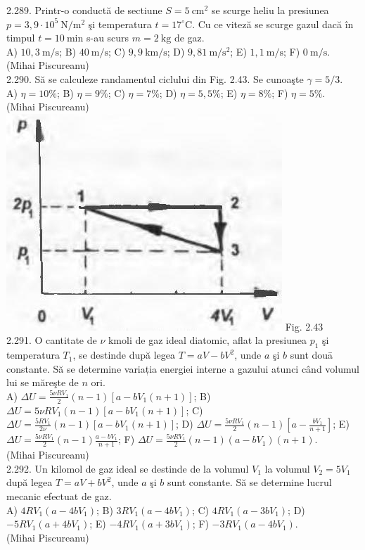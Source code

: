 2.289. Printr-o conductă de sectiune $S=5 \mathrm{~cm}^{2}$ se scurge heliu la presiunea $p=3,9 \cdot 10^{5} \mathrm{~N} / \mathrm{m}^{2}$ şi temperatura $t=17^{\circ} \mathrm{C}$. Cu ce viteză se scurge gazul dacă în timpul $t=10 \mathrm{~min}$ s-au scurs $m=2 \mathrm{~kg}$ de gaz.\\ A) $10,3 \mathrm{~m} / \mathrm{s}$; B) $40 \mathrm{~m} / \mathrm{s}$; C) $9,9 \mathrm{~km} / \mathrm{s}$; D) $9,81 \mathrm{~m} / \mathrm{s}^{2}$; E) $1,1 \mathrm{~m} / \mathrm{s}$; F) $0 \mathrm{~m} / \mathrm{s}$.\\ (Mihai Piscureanu)\\

2.290. Să se calculeze randamentul ciclului din Fig. 2.43. Se cunoaşte $\gamma=5 / 3$.\\ A) $\eta=10 \%$; B) $\eta=9 \%$; C) $\eta=7 \%$; D) $\eta=5,5 \%$; E) $\eta=8 \%$; F) $\eta=5 \%$.\\ (Mihai Piscureanu)\\ \includegraphics[width=0.4\linewidth]{images/2025_07_01_5b3ff9fa0d508c8e9f17g-138} Fig. 2.43\\

2.291. O cantitate de $\nu$ kmoli de gaz ideal diatomic, aflat la presiunea $p_{1}$ şi temperatura $T_{1}$, se destinde după legea $T=a V-b V^{2}$, unde $a$ şi $b$ sunt douā constante. Să se determine variația energiei interne a gazului atunci când volumul lui se măreşte de $n$ ori.\\ A) $\Delta U=\frac{5 \nu R V_{1}}{2}(n-1)\left[a-b V_{1}(n+1)\right]$; B) $\Delta U=5 \nu R V_{1}(n-1)\left[a-b V_{1}(n+1)\right]$; C) $\Delta U=\frac{5 R V_{1}}{2 \nu}(n-1)\left[a-b V_{1}(n+1)\right]$; D) $\Delta U=\frac{5 \nu R V_{1}}{2}(n-1)\left[a-\frac{b V_{1}}{n+1}\right]$; E) $\Delta U=\frac{5 \nu R V_{1}}{2}(n-1) \frac{a-b V_{1}}{n+1}$; F) $\Delta U=\frac{5 \nu R V_{1}}{2}(n-1)\left(a-b V_{1}\right)(n+1)$.\\ (Mihai Piscureanu)\\

2.292. Un kilomol de gaz ideal se destinde de la volumul $V_{1}$ la volumul $V_{2}=5 V_{1}$ după legea $T=a V+b V^{2}$, unde $a$ şi $b$ sunt constante. Să se determine lucrul mecanic efectuat de gaz.\\ A) $4 R V_{1}\left(a-4 b V_{1}\right)$; B) $3 R V_{1}\left(a-4 b V_{1}\right)$; C) $4 R V_{1}\left(a-3 b V_{1}\right)$; D) $-5 R V_{1}\left(a+4 b V_{1}\right)$; E) $-4 R V_{1}\left(a+3 b V_{1}\right)$; F) $-3 R V_{1}\left(a-4 b V_{1}\right)$.\\ (Mihai Piscureanu)\\


